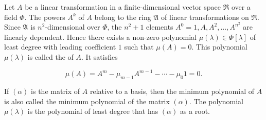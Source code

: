 Let $A$ be a linear transformation in a finite-dimensional vector space $\Re$ over a field $\Phi$. The powers $A^k$ of $A$ belong to the ring $\mathfrak{A}$ of linear transformations on $\Re$. Since $\mathfrak{A}$ is $n^2$-dimensional over $\Phi$, the $n^2+1$ elements $A^0=1, A, A^2, \dots, A^{n^2}$ are linearly dependent. Hence there exists a non-zero polynomial $\mu(\lambda) \in \Phi[\lambda]$ of least degree with leading coefficient $1$ such that $\mu(A)=0$. This polynomial $\mu(\lambda)$ is called the  of $A$. It satisfies

$$\mu(A) = A^m - \mu_{m-1}A^{m-1} - \cdots - \mu_0 1 = 0.$$

If $(\alpha)$ is the matrix of $A$ relative to a basis, then the minimum polynomial of $A$ is also called the minimum polynomial of the matrix $(\alpha)$. The polynomial $\mu(\lambda)$ is the polynomial of least degree that has $(\alpha)$ as a root.

